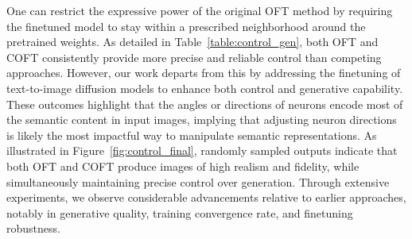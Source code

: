 \begin{itemize}[leftmargin=*,nosep]
\begin{itemize}[leftmargin=*,nosep]
One can restrict the expressive power of the original OFT method by requiring the finetuned model to stay within a prescribed neighborhood around the pretrained weights. As detailed in Table~\ref{table:control_gen}, both OFT and COFT consistently provide more precise and reliable control than competing approaches. However, our work departs from this by addressing the finetuning of text-to-image diffusion models to enhance both control and generative capability. These outcomes highlight that the angles or directions of neurons encode most of the semantic content in input images, implying that adjusting neuron directions is likely the most impactful way to manipulate semantic representations. As illustrated in Figure~\ref{fig:control_final}, randomly sampled outputs indicate that both OFT and COFT produce images of high realism and fidelity, while simultaneously maintaining precise control over generation. Through extensive experiments, we observe considerable advancements relative to earlier approaches, notably in generative quality, training convergence rate, and finetuning robustness. \end{itemize}


\end{itemize}
